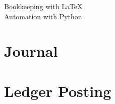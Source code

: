 



	\begin{center}
		{\Huge Bookkeeping with \LaTeX}\\[5pt]{\LARGE Automation with Python}
	\end{center}
	\section{Journal}
	
	\section{Ledger Posting}
	
